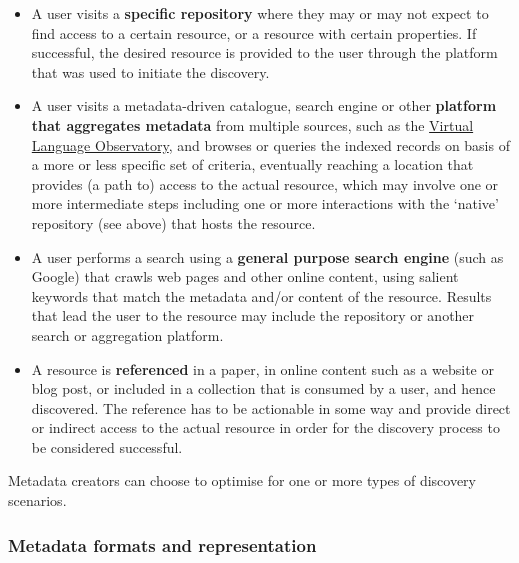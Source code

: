 \documentclass[]{article}
\providecommand{\tightlist}{%
  \setlength{\itemsep}{0pt}\setlength{\parskip}{0pt}}
\begin{document}
\begin{itemize}
\tightlist
\item
  A user visits a \textbf{specific repository} where they may or may not
  expect to find access to a certain resource, or a resource with
  certain properties. If successful, the desired resource is provided to
  the user through the platform that was used to initiate the discovery.
\item
  A user visits a metadata-driven catalogue, search engine or other
  \textbf{platform that aggregates metadata} from multiple sources, such
  as the \href{https://www.clarin.eu/vlo}{Virtual Language Observatory},
  and browses or queries the indexed records on basis of a more or less
  specific set of criteria, eventually reaching a location that provides
  (a path to) access to the actual resource, which may involve one or
  more intermediate steps including one or more interactions with the
  `native' repository (see above) that hosts the resource.
\item
  A user performs a search using a \textbf{general purpose search
  engine} (such as Google) that crawls web pages and other online
  content, using salient keywords that match the metadata and/or content
  of the resource. Results that lead the user to the resource may
  include the repository or another search or aggregation platform.
\item
  A resource is \textbf{referenced} in a paper, in online content such
  as a website or blog post, or included in a collection that is
  consumed by a user, and hence discovered. The reference has to be
  actionable in some way and provide direct or indirect access to the
  actual resource in order for the discovery process to be considered
  successful.
\end{itemize}

Metadata creators can choose to optimise for one or more types of
discovery scenarios.

\subsubsection{Metadata formats and
representation}\label{metadata-formats-and-representation}
\end{document}
